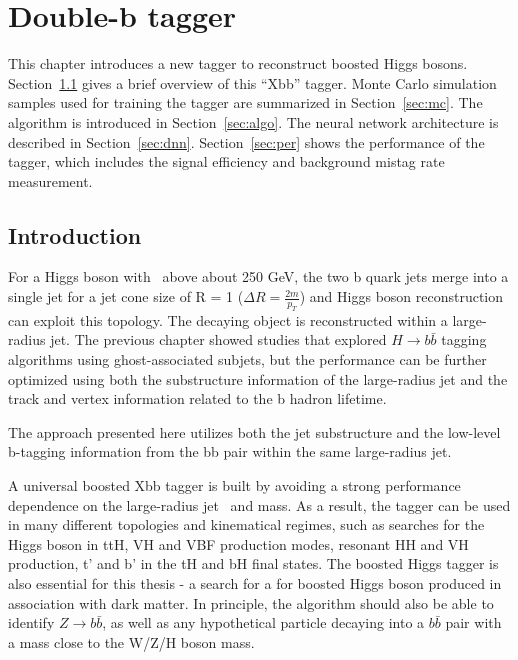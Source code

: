 \chapter{Double-b tagger}
\label{ch:xbb}

\par This chapter introduces a new tagger to reconstruct boosted Higgs bosons. Section~\ref{sec:intro} gives a brief overview of this ``Xbb'' tagger. 
Monte Carlo simulation samples used for training the tagger are summarized in Section~\ref{sec:mc}.
The algorithm is introduced in Section~\ref{sec:algo}. The neural network architecture is described in Section~\ref{sec:dnn}. 
Section~\ref{sec:per} shows the performance of the tagger, which includes the signal efficiency and background mistag rate measurement.

\section{Introduction}
\label{sec:intro}

\par For a Higgs boson with \pt~above about 250 GeV, the two b quark jets merge into a single jet for a jet cone size of R = 1 ($\Delta R = \frac{2m}{p_T}$) and Higgs boson reconstruction can exploit this topology. The decaying object is reconstructed within a large-radius jet. 
The previous chapter showed studies that explored $H\rightarrow b\bar{b}$ tagging algorithms using ghost-associated subjets, 
but the performance can be further optimized using both the substructure information of the large-radius jet and the track and vertex information related to the b hadron lifetime. 
\par The approach presented here utilizes both the jet substructure and the low-level b-tagging information from the bb pair within the same large-radius jet.

\par A universal boosted Xbb tagger is built by avoiding a strong performance dependence on the large-radius jet \pt~and mass. As a result, 
the tagger can be used in many different topologies and kinematical regimes, such as searches for the Higgs boson in ttH, VH and VBF production modes, 
resonant HH and VH production, t' and b' in the tH and bH final states. The boosted Higgs tagger is also essential for this thesis - a search for a for boosted Higgs boson produced in association with dark matter. 
In principle, the algorithm should also be able to identify $Z\rightarrow b\bar{b}$, as well as any hypothetical particle decaying into a $b\bar{b}$ pair with a mass close to the W/Z/H boson mass.

